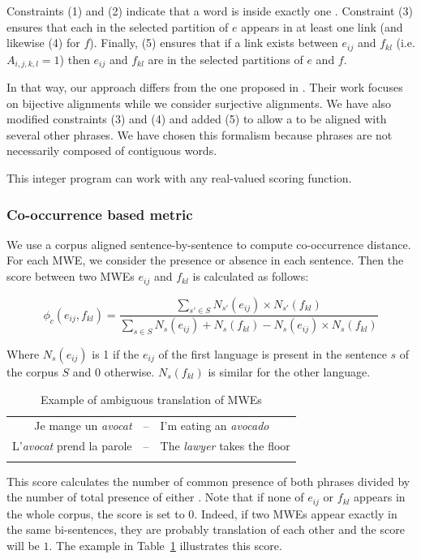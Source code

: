 \documentclass[output=paper,modfonts,nonflat]{langsci/langscibook}
\begin{document}
Constraints (1) and (2) indicate that a word is inside exactly one . Constraint (3) ensures that each  in the selected partition of $e$ appears in at least one link (and likewise  (4) for $f$). Finally,  (5) ensures that if a link exists between $e_{ij}$ and $f_{kl}$ (i.e. $A_{i,j,k,l}=1$) then $e_{ij}$ and $f_{kl}$ are in the selected partitions of $e$ and $f$.

In that way, our approach differs from the one proposed in \citet{denero2008complexity}. 
Their work focuses on bijective alignments while we consider surjective alignments. 
We have also modified constraints (3) and (4) and added  (5) to allow a  to be aligned with several other phrases. 
We have chosen this formalism because phrases are not necessarily composed of contiguous words.

This integer program can work with any real-valued scoring function.

\subsubsection{Co-occurrence based metric}

We use a corpus aligned sentence-by-sentence to compute co-occurrence distance. For each MWE, we consider the presence or absence in each sentence. Then the score between two MWEs $e_{ij}$ and $f_{kl}$ is calculated as follows:

\begin{equation}
\phi_c(e_{ij},f_{kl})=\frac{\sum\limits_{s'\in S} N_{s'}(e_{ij}) \times N_{s'}(f_{kl})}{\sum\limits_{s\in S} N_{s}(e_{ij}) + N_{s}(f_{kl}) - N_{s}(e_{ij}) \times N_{s}(f_{kl})}
\end{equation}

Where $N_{s}(e_{ij})$ is 1 if the  $e_{ij}$ of the first language is present in the sentence $s$ of the corpus $S$ and $0$ otherwise. 
$N_{s}(f_{kl})$ is similar for the other language.

\begin{table}[h!]
\begin{tabular}{rcl}
  \lsptoprule
Je mange un \emph{avocat} & -- & I'm eating an \emph{avocado} \\
L'\emph{avocat} prend la parole & -- & The \emph{lawyer} takes the floor \\
  \lspbottomrule
\end{tabular}
\caption{\label{sem:tab:probtrans} Example of ambiguous translation of MWEs}
\end{table}
This score calculates the number of common presence of both phrases divided by the number of total presence of either . 
Note that if none of $e_{ij}$ or $f_{kl}$ appears in the whole corpus, the score is set to $0$. 
Indeed, if two MWEs appear exactly in the same bi-sentences, they are probably translation of each other and the score will be $1$. 
The example in Table~\ref{sem:tab:probtrans} illustrates this score.
\end{document}
